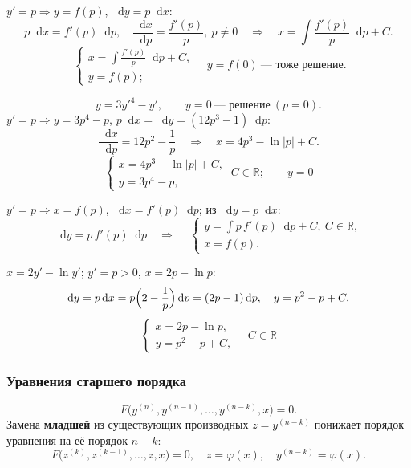 \documentclass[12pt,a4paper]{article}
\numberwithin{equation}{section}
\newcommand{\R}{\mathbb{R}}
\newcommand{\dd}{\mathop{}\!\mathrm{d}}
\begin{document}
\label{box:type13}
\begin{definitionHSE}[Уравнения типа 13: \(y=f(y')\)]
$\boxed{y'=p}\Rightarrow y=f(p)$, $\dd y=p\dd x$:
\[
p\dd x=f'(p)\dd p,\quad \frac{\dd x}{\dd p}=\frac{f'(p)}{p},\ p\neq0\quad\Longrightarrow\quad x=\int\frac{f'(p)}{p}\dd p+C.
\]
\[
\boxed{\ \begin{cases}x=\displaystyle\int\frac{f'(p)}{p}\dd p+C,\\ y=f(p);\end{cases}\quad y=f(0)\ \text{--- тоже решение.}}
\]
\end{definitionHSE}

\begin{exampleHSE}[\(3y'^4=y'+y\)]
\[
y=3y'^4-y',\qquad y=0\ \text{--- решение}\ (p=0).
\]
$y'=p\Rightarrow y=3p^4-p$, $p\dd x=\dd y=(12p^3-1)\dd p$:
\[
\frac{\dd x}{\dd p}=12p^2-\frac1p\quad\Longrightarrow\quad x=4p^3-\ln|p|+C.
\]
\[
\boxed{\ \begin{cases}x=4p^3-\ln|p|+C,\\ y=3p^4-p,\end{cases}\ C\in\R;\qquad y=0\ }
\]
\end{exampleHSE}

\label{box:type14}
\begin{definitionHSE}[Уравнения типа 14: \(x=f(y')\)]
$\boxed{y'=p}\Rightarrow x=f(p)$, $\dd x=f'(p)\dd p$; из $\dd y=p\dd x$:
\[
\dd y=p\,f'(p)\dd p\quad\Longrightarrow\quad
\boxed{\ \begin{cases}y=\displaystyle\int p\,f'(p)\dd p+C,\ C\in\R,\\ x=f(p).\end{cases}}
\]
\end{definitionHSE}

\begin{exampleHSE}[\(2y'=x+\ln y'\) (№360)]
$x=2y'-\ln y'$; $y'=p>0$, $x=2p-\ln p$:
\[
\dd y=p\dd x=p\Bigl(2-\frac1p\Bigr)\dd p=(2p-1)\dd p,\quad y=p^2-p+C.
\]
\[
\boxed{\ \begin{cases}x=2p-\ln p,\\ y=p^2-p+C,\end{cases}\quad C\in\R\ }
\]
\end{exampleHSE}

\subsubsection{Уравнения старшего порядка}
\label{box:type15}
\begin{definitionHSE}
\[
F\bigl(y^{(n)},y^{(n-1)},\ldots,y^{(n-k)},x\bigr)=0.
\]
Замена \textbf{младшей} из существующих производных $z=y^{(n-k)}$ понижает порядок уравнения на её порядок $n-k$:
\[
F\bigl(z^{(k)},z^{(k-1)},\ldots,z,x\bigr)=0,\quad z=\varphi(x),\quad y^{(n-k)}=\varphi(x).
\]
\end{definitionHSE}
\end{document}
